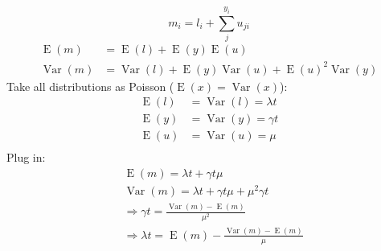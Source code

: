\documentclass[pdftex,12pt,a4paper]{scrartcl}
\newcommand{\E}{\operatorname{E}}
\newcommand{\Var}{\operatorname{Var}}
\begin{document}
\begin{equation}
    m_i = l_i + \sum_j^{y_i} u_{ji}
\end{equation}
\begin{equation}
\begin{aligned}
    \E(m) &= \E(l) + \E(y) \E(u) \\
    \Var(m) &= \Var(l) + \E(y) \Var(u) + \E(u)^2 \Var(y)
\end{aligned}
\end{equation}
Take all distributions as Poisson ($\E(x) = \Var(x)$):
\begin{align*}
    \E(l) & = \Var(l) =  \lambda t \\
    \E(y) & = \Var(y) =  \gamma t \\
    \E(u) & = \Var(u) =  \mu \\
\end{align*}
Plug in:
\begin{align*}
    &\E(m) = \lambda t + \gamma t \mu \\
    &\Var(m) = \lambda t + \gamma t \mu + \mu^2 \gamma t \\
    & \Rightarrow \gamma t = \frac{\Var(m)-\E(m)}{\mu^2} \\
    & \Rightarrow \lambda t = \E(m) - \frac{\Var(m)-\E(m)}{\mu} \\
\end{align*}
\end{document}
